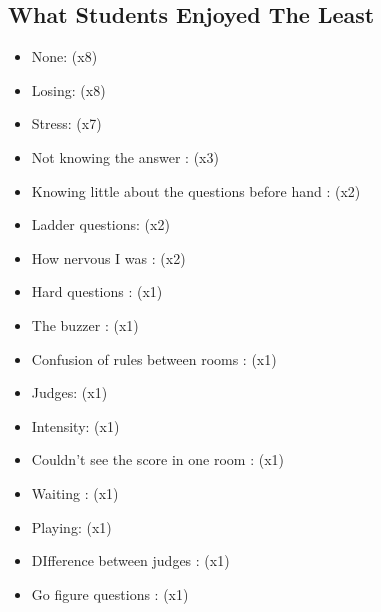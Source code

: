 \documentclass{article}%
\begin{document}
\begin{multicols}{2}%
\section{What Students Enjoyed The Least}%
\label{sec:WhatStudentsEnjoyedTheLeast}%
\begin{itemize}%
\item%
None: (x8)%
\item%
Losing: (x8)%
\item%
Stress: (x7)%
\item%
Not knowing the answer : (x3)%
\item%
Knowing little about the questions before hand : (x2)%
\item%
Ladder questions: (x2)%
\item%
How nervous I was : (x2)%
\item%
Hard questions : (x1)%
\item%
The buzzer : (x1)%
\item%
Confusion of rules between rooms : (x1)%
\item%
Judges: (x1)%
\item%
Intensity: (x1)%
\item%
Couldn't see the score in one room : (x1)%
\item%
Waiting : (x1)%
\item%
Playing: (x1)%
\item%
DIfference between judges : (x1)%
\item%
Go figure questions : (x1)%
\end{itemize}

%
\end{multicols}%
\noindent\makebox[\linewidth]{\rule{\paperwidth}{0.4pt}}%
\end{document}
